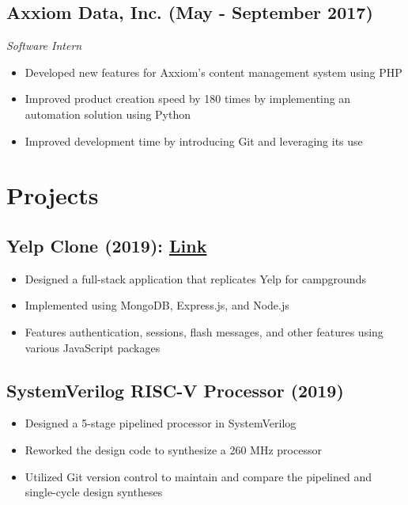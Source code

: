 \documentclass[10pt]{article}
\begin{document}
\subsection{Axxiom Data, Inc. (May - September 2017)}

\noindent\textit{Software Intern}

\begin{itemize}
	\setlength\itemsep{0em}
	\item Developed new features for Axxiom's content management system using PHP
	\item Improved product creation speed by 180 times by implementing an automation solution using Python
	\item Improved development time by introducing Git and leveraging its use
\end{itemize}

\section{Projects}
\subsection{Yelp Clone (2019): \href{https://github.com/brandonhawi/YelpCamp}{Link}}

\begin{itemize}[leftmargin=0.6cm]
	\setlength\itemsep{0em}
	\item Designed a full-stack application that replicates Yelp for campgrounds
	\item Implemented using MongoDB, Express.js, and Node.js
	\item Features authentication, sessions, flash messages, and other features using various JavaScript packages
\end{itemize}

\subsection{SystemVerilog RISC-V Processor (2019)}

\begin{itemize}
	\setlength\itemsep{0em}
	\item Designed a 5-stage pipelined processor in SystemVerilog
	\item Reworked the design code to synthesize a 260 MHz processor
	\item Utilized Git version control to maintain and compare the pipelined and single-cycle design syntheses
\end{itemize}
\end{document}
